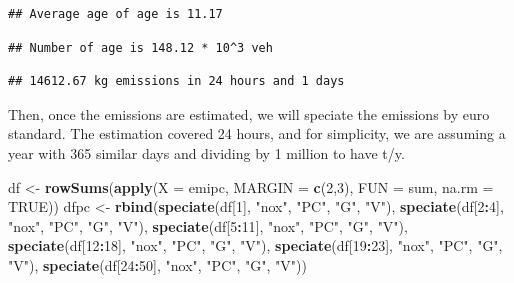 \documentclass[12pt,graybox,envcountchap,sectrefs]{krantz}
\makeatletter
\newenvironment{Shaded}{\begin{snugshade}}{\end{snugshade}}
\newcommand{\KeywordTok}[1]{\textcolor[rgb]{0.13,0.29,0.53}{\textbf{#1}}}
\newcommand{\DataTypeTok}[1]{\textcolor[rgb]{0.13,0.29,0.53}{#1}}
\newcommand{\DecValTok}[1]{\textcolor[rgb]{0.00,0.00,0.81}{#1}}
\newcommand{\StringTok}[1]{\textcolor[rgb]{0.31,0.60,0.02}{#1}}
\newcommand{\OtherTok}[1]{\textcolor[rgb]{0.56,0.35,0.01}{#1}}
\newcommand{\OperatorTok}[1]{\textcolor[rgb]{0.81,0.36,0.00}{\textbf{#1}}}
\newcommand{\NormalTok}[1]{#1}
\newenvironment{kframe}{%
\medskip{}
\setlength{\fboxsep}{.8em}
 \def\at@end@of@kframe{}%
 \ifinner\ifhmode%
  \def\at@end@of@kframe{\end{minipage}}%
  \begin{minipage}{\columnwidth}%
 \fi\fi%
 \def\FrameCommand##1{\hskip\@totalleftmargin \hskip-\fboxsep
 \colorbox{shadecolor}{##1}\hskip-\fboxsep
     \hskip-\linewidth \hskip-\@totalleftmargin \hskip\columnwidth}%
 \MakeFramed {\advance\hsize-\width
   \@totalleftmargin\z@ \linewidth\hsize
   \@setminipage}}%
 {\par\unskip\endMakeFramed%
 \at@end@of@kframe}
\renewenvironment{Shaded}{\begin{kframe}}{\end{kframe}}
\theoremstyle{definition}
\theoremstyle{definition}
\theoremstyle{definition}
\theoremstyle{remark}
\makeatother
\begin{document}
\begin{verbatim}
## Average age of age is 11.17
\end{verbatim}

\begin{verbatim}
## Number of age is 148.12 * 10^3 veh
\end{verbatim}

\begin{verbatim}
## 14612.67 kg emissions in 24 hours and 1 days
\end{verbatim}

Then, once the emissions are estimated, we will speciate the emissions
by euro standard. The estimation covered 24 hours, and for simplicity,
we are assuming a year with 365 similar days and dividing by 1 million
to have t/y.

\begin{Shaded}
\begin{Highlighting}[]
\NormalTok{df <-}\StringTok{ }\KeywordTok{rowSums}\NormalTok{(}\KeywordTok{apply}\NormalTok{(}\DataTypeTok{X =}\NormalTok{ emipc, }\DataTypeTok{MARGIN =} \KeywordTok{c}\NormalTok{(}\DecValTok{2}\NormalTok{,}\DecValTok{3}\NormalTok{), }\DataTypeTok{FUN =}\NormalTok{ sum, }\DataTypeTok{na.rm =} \OtherTok{TRUE}\NormalTok{))}
\NormalTok{dfpc <-}\StringTok{   }\KeywordTok{rbind}\NormalTok{(}\KeywordTok{speciate}\NormalTok{(df[}\DecValTok{1}\NormalTok{], }\StringTok{"nox"}\NormalTok{, }\StringTok{"PC"}\NormalTok{, }\StringTok{"G"}\NormalTok{, }\StringTok{"V"}\NormalTok{),}
                \KeywordTok{speciate}\NormalTok{(df[}\DecValTok{2}\OperatorTok{:}\DecValTok{4}\NormalTok{], }\StringTok{"nox"}\NormalTok{, }\StringTok{"PC"}\NormalTok{, }\StringTok{"G"}\NormalTok{, }\StringTok{"V"}\NormalTok{),}
                \KeywordTok{speciate}\NormalTok{(df[}\DecValTok{5}\OperatorTok{:}\DecValTok{11}\NormalTok{], }\StringTok{"nox"}\NormalTok{, }\StringTok{"PC"}\NormalTok{, }\StringTok{"G"}\NormalTok{, }\StringTok{"V"}\NormalTok{),}
                \KeywordTok{speciate}\NormalTok{(df[}\DecValTok{12}\OperatorTok{:}\DecValTok{18}\NormalTok{], }\StringTok{"nox"}\NormalTok{, }\StringTok{"PC"}\NormalTok{, }\StringTok{"G"}\NormalTok{, }\StringTok{"V"}\NormalTok{),}
                \KeywordTok{speciate}\NormalTok{(df[}\DecValTok{19}\OperatorTok{:}\DecValTok{23}\NormalTok{], }\StringTok{"nox"}\NormalTok{, }\StringTok{"PC"}\NormalTok{, }\StringTok{"G"}\NormalTok{, }\StringTok{"V"}\NormalTok{),}
                \KeywordTok{speciate}\NormalTok{(df[}\DecValTok{24}\OperatorTok{:}\DecValTok{50}\NormalTok{], }\StringTok{"nox"}\NormalTok{, }\StringTok{"PC"}\NormalTok{, }\StringTok{"G"}\NormalTok{, }\StringTok{"V"}\NormalTok{))}

\end{Highlighting}
\end{Shaded}
\end{document}
